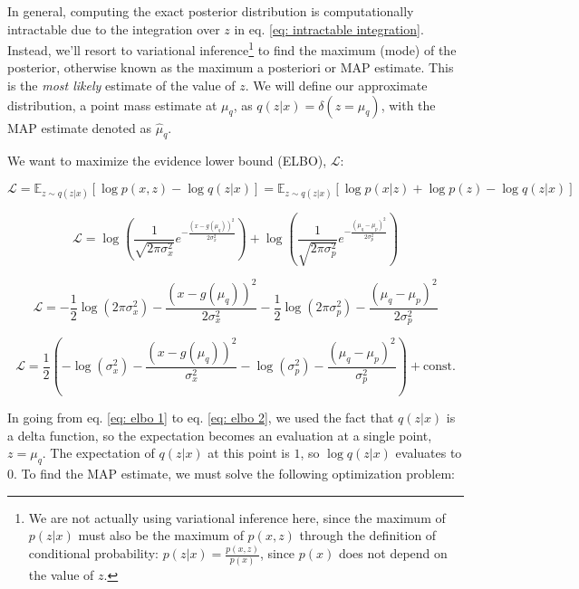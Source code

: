 In general, computing the exact posterior distribution is computationally intractable due to the integration over $z$ in eq. \ref{eq: intractable integration}. Instead, we'll resort to variational inference\footnote{We are not actually using variational inference here, since the maximum of $p(z | x)$ must also be the maximum of $p(x, z)$ through the definition of conditional probability: $p(z|x) = \frac{p(x, z)}{p(x)}$, since $p(x)$ does not depend on the value of $z$. } to find the maximum (mode) of the posterior, otherwise known as the maximum a posteriori or MAP estimate. This is the \textit{most likely} estimate of the value of $z$. We will define our approximate distribution, a point mass estimate at $\mu_q$, as $q(z|x) = \delta (z = \mu_q)$, with the MAP estimate denoted as $\hat{\mu}_q$.

We want to maximize the evidence lower bound (ELBO), $\mathcal{L}$:

\begin{equation}
	\mathcal{L} = \mathbb{E}_{z \sim q(z|x)} \left[ \log p(x, z) - \log q(z|x) \right] = \mathbb{E}_{z \sim q(z|x)} \left[ \log p(x|z) + \log p(z) - \log q(z|x) \right] 
	\label{eq: elbo 1}
\end{equation}

\begin{equation}
	\mathcal{L} = \log \left( \frac{1}{\sqrt{2 \pi \sigma_x^2}} e^{-\frac{(x - g(\mu_q))^2}{2 \sigma_x^2}} \right) + \log \left( \frac{1}{\sqrt{2 \pi \sigma_p^2}} e^{-\frac{(\mu_q - \mu_p)^2}{2 \sigma_p^2}} \right)
	\label{eq: elbo 2}
\end{equation}

\begin{equation}
	\mathcal{L} = -\frac{1}{2} \log ( 2 \pi \sigma_x^2 )  - \frac{(x - g(\mu_q))^2}{2 \sigma_x^2} - \frac{1}{2} \log ( 2 \pi \sigma_p^2 ) -\frac{(\mu_q - \mu_p)^2}{2 \sigma_p^2}
	\label{eq: elbo 3}
\end{equation}

\begin{equation}
	\mathcal{L} = \frac{1}{2} \left( - \log ( \sigma_x^2 )  - \frac{(x - g(\mu_q))^2}{\sigma_x^2} - \log ( \sigma_p^2 ) -\frac{(\mu_q - \mu_p)^2}{\sigma_p^2} \right) + \text{const.}
	\label{eq: elbo 4}
\end{equation}

\noindent In going from eq. \ref{eq: elbo 1} to eq. \ref{eq: elbo 2}, we used the fact that $q(z|x)$ is a delta function, so the expectation becomes an evaluation at a single point, $z=\mu_q$. The expectation of $q(z|x)$ at this point is $1$, so $\log q(z|x)$ evaluates to $0$. To find the MAP estimate, we must solve the following optimization problem:


